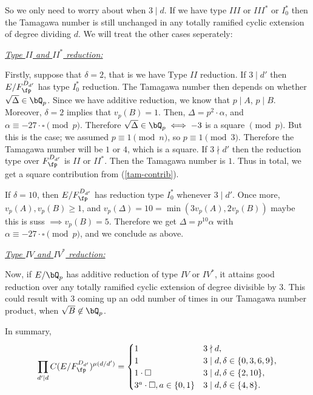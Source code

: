 So we only need to worry about when $3 \mid d$. If we have type $III$ or $III^*$ or $I_0^*$ then the Tamagawa number is still unchanged in any totally ramified cyclic extension of degree dividing $d$. We will treat the other cases seperately: 

\vspace{1em}

\noindent\underline{\textit{Type $II$ and $II^*$ reduction:}}

Firstly, suppose that $\delta = 2$, that is we have Type $II$ reduction. If $3 \mid d'$ then $E / F_{\fp}^{D_{d'}}$ has type $I_0^*$ reduction. The Tamagawa number then depends on whether $\sqrt{\Delta} \in \bQ_p$. Since we have additive reduction, we know that $p \mid A$, $p \mid B$. Moreover, $\delta = 2$ implies that $v_p(B) = 1$. Then, $\Delta = p^2\cdot \alpha$, and $\alpha \equiv -27\cdot\square \pmod p$. Therefore $\sqrt{\Delta} \in \bQ_p \iff -3$ is a square $\pmod p$. But this is the case; we assumed $p \equiv 1 \pmod n$, so $p \equiv 1 \pmod 3$. Therefore the Tamagawa number will be $1$ or $4$, which is a square.
If $3 \nmid d'$ then the reduction type over $ F_{\fp}^{D_{d'}}$ is $II$ or $II^*$. Then the Tamagawa number is $1$. Thus in total, we get a square contribution from (\ref{tam-contrib}).

If $\delta = 10$, then $E / F_{\fp}^{D_{d'}}$ has reduction type $I_0^*$ whenever $3 \mid d'$. Once more, $v_p(A), v_p(B) \geq 1$, and $v_p(\Delta) = 10 = \min(3 v_p(A), 2 v_p(B))$ {\color{red} maybe this is suss} $\implies v_p(B) = 5$. Therefore we get $\Delta = p^{10} \alpha$ with $\alpha \equiv -27\cdot\square \pmod p$, and we conclude as above.

\vspace{1em}

\noindent\underline{\textit{Type $IV$ and $IV^*$ reduction:}}

Now, if $E /\bQ_p$ has additive reduction of type $IV$ or $IV^*$, it attains good reduction over any totally ramified cyclic extension of degree divisible by $3$. This could result with $3$ coming up an odd number of times in our Tamagawa number product, when $\sqrt{B} \not\in \bQ_p$. 

\vspace{1em}
In summary, 
\begin{equation}
    \prod_{d ' \mid d} C(E / F_{\fp}^{D_{d'}})^{\mu(d / d')}
    = 
    \begin{cases}
        1 & 3 \nmid d, \\
        1 & 3 \mid d, \delta \in \{0, 3, 6, 9\}, \\
        1 \cdot \square & 3 \mid d, \delta \in \{2, 10\}, \\
        3^a \cdot\square, a \in \{0,1\} & 3 \mid d, \delta \in \{4,8\}.
    \end{cases}
\end{equation}


